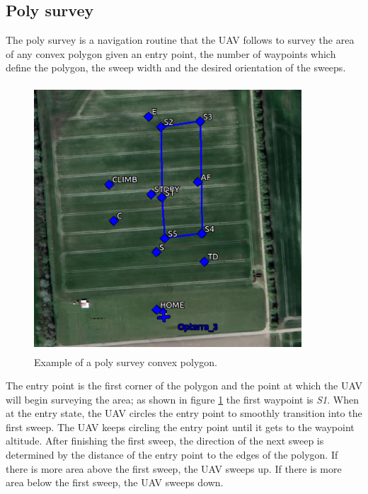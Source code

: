 \subsection{Poly survey}
The poly survey is a navigation routine that the UAV follows to survey the area of any convex polygon given an entry point, the number of waypoints which define the polygon, the sweep width and the desired orientation of the sweeps.
\begin{figure}[H]
\centering
\includegraphics[width=10cm,height=10cm,keepaspectratio]{imagenes/Convex_polygon.png}
\caption{Example of a poly survey convex polygon.}
\label{fig:Convex_poly}
\end{figure}
The entry point is the first corner of the polygon and the point at which the UAV will begin surveying the area; as shown in figure \ref{fig:Convex_poly} the first waypoint is \textit{S1}. When at the entry state, the UAV circles the entry point to smoothly transition into the first sweep. The UAV keeps circling the entry point until it gets to the waypoint altitude. After finishing the first sweep, the direction of the next sweep is determined by the distance of the entry point to the edges of the polygon. If there is more area above the first sweep, the UAV sweeps up. If there is more area below the first sweep, the UAV sweeps down.\cite{Poly_survey}

